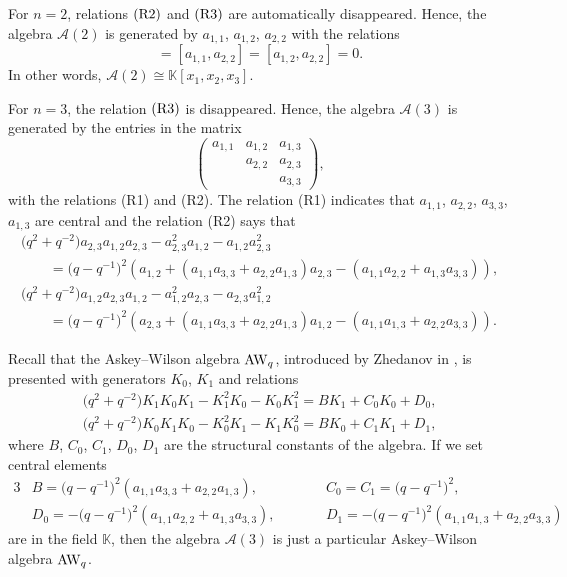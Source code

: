 \documentclass[10pt,a4paper]{amsart}
\numberwithin{equation}{section}
\def\lrb#1{\left(#1\right)}
\def\K{\mathbb{K}}
\def\A{\mathscr{A}}
\begin{document}
\begin{Remark}\label{remark}
For $n=2$, relations ${\rm (R2)}$ and ${\rm (R3)}$ are automatically disappeared.
Hence, the algebra $\A(2)$ is generated by $a_{1,1}$, $ a_{1,2}$, $a_{2,2}$ with the relations
\begin{equation*}
[a_{1,1},a_{1,2}]=[a_{1,1},a_{2,2}]=[a_{1,2},a_{2,2}]=0.
\end{equation*}
In other words, $\A(2)\cong \K[x_1, x_2, x_3].$

For $n=3$, the relation ${\rm (R3)}$ is disappeared.
Hence, the algebra $\A(3)$ is generated by the entries in the matrix
\begin{equation*}
\begin{pmatrix}
a_{1,1}& a_{1,2}&a_{1,3}\\
& a_{2,2}&a_{2,3}\\
& &a_{3,3}
\end{pmatrix}
,
\end{equation*}
with the relations {\rm (R1)} and {\rm (R2)}.
The relation {\rm (R1)} indicates that $a_{1,1}$, $a_{2,2}$, $a_{3,3}$, $a_{1,3}$ are central and the relation {\rm (R2)} says that
\begin{gather*}
\bigl(q^2+q^{-2}\bigr)a_{2,3}a_{1,2}a_{2,3}-a_{2,3}^2a_{1,2}-a_{1,2}a_{2,3}^2 \\
\qquad=\bigl(q-q^{-1}\bigr)^2 (a_{1, 2}+\lrb{a_{1, 1}a_{3, 3} + a_{2, 2 }a_{1, 3}} a_{2, 3} -\lrb{a_{1, 1}a_{2, 2}+a_{1, 3}a_{3, 3}}),\\
\bigl(q^2+q^{-2}\bigr)a_{1,2}a_{2,3}a_{1,2}-a_{1,2}^2a_{2,3}-a_{2,3}a_{1,2}^2 \\
\qquad=\bigl(q-q^{-1}\bigr)^2 (a_{2, 3}+ \lrb{a_{1, 1}a_{3, 3} + a_{2, 2 }a_{1, 3}}a_{1, 2}-\lrb{a_{1, 1}a_{1, 3}+a_{2, 2}a_{3, 3}}).
\end{gather*}
\end{Remark}
Recall that the Askey--Wilson algebra ${\rm AW}_q$, introduced by Zhedanov in \cite{Zhe(1991)}, is presented with generators $K_0$, $K_1$ and relations
\begin{gather*}
\bigl(q^2+q^{-2}\bigr)K_1K_0K_1-K_1^2K_0-K_0K_1^2=BK_1+C_0K_0+D_0,\\
\bigl(q^2+q^{-2}\bigr)K_0K_1K_0-K_0^2K_1-K_1K_0^2=BK_0+C_1K_1+D_1,
\end{gather*}
where $B$, $C_0$, $C_1$, $D_0$, $D_1$ are the structural constants of the algebra.
If we set central elements
\begin{alignat*}{3}
& B=\bigl(q-q^{-1}\bigr)^2\lrb{a_{1, 1}a_{3, 3} + a_{2, 2 }a_{1, 3}}, \qquad && C_0=C_1=\bigl(q-q^{-1}\bigr)^2, & \\
& D_0=-\bigl(q-q^{-1}\bigr)^2\lrb{a_{1, 1}a_{2, 2}+a_{1, 3}a_{3, 3}}, \qquad&&
D_1=-\bigl(q-q^{-1}\bigr)^2\lrb{a_{1, 1}a_{1, 3}+a_{2, 2}a_{3, 3}}&
\end{alignat*}
are in the field $\K$, then the algebra $\A(3)$ is just a particular Askey--Wilson algebra ${\rm AW}_q$.
\end{document}
